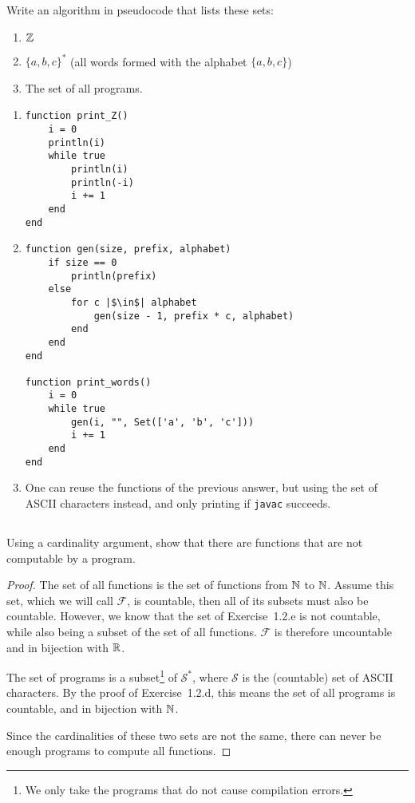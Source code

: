 \subsection{} %
Write an algorithm in pseudocode that lists these sets:
\begin{enumerate}
	\item \(\mathbb{Z}\)
	\item \(\{a, b, c\}^*\)
	(all words formed with the alphabet \(\{a, b, c\}\))
	\item The set of all \java{} programs.
\end{enumerate}

\begin{solution}
\begin{enumerate}
\item
\begin{verbatim}
function print_Z()
	i = 0
	println(i)
	while true
		println(i)
		println(-i)
		i += 1
	end
end
\end{verbatim}
\item
\begin{verbatim}
function gen(size, prefix, alphabet)
	if size == 0
		println(prefix)
	else
		for c |$\in$| alphabet
			gen(size - 1, prefix * c, alphabet)
		end
	end
end

function print_words()
	i = 0
	while true
		gen(i, "", Set(['a', 'b', 'c']))
		i += 1
	end
end
\end{verbatim}
\item One can reuse the functions of the previous answer,
but using the set of ASCII characters instead,
and only printing if \texttt{javac} succeeds.
\end{enumerate}
\end{solution}

\subsection{} %
Using a cardinality argument,
show that there are functions that are not computable by a \java{} program.

\begin{solution}
\begin{proof}
	The set of all functions is the set of functions from \(\mathbb{N}\) to \(\mathbb{N}\).
	Assume this set, which we will call \(\mathcal{F}\), is countable,
	then all of its subsets must also be countable.
	However, we know that the set of Exercise~1.2.e is not countable,
	while also being a subset of the set of all functions.
	\(\mathcal{F}\) is therefore uncountable and in bijection with \(\mathbb{R}\).

	The set of \java{} programs is a subset\footnote{We only take
	the programs that do not cause compilation errors.}
	of \(\mathcal{S}^*\),
	where \(\mathcal{S}\) is the (countable) set of ASCII characters.
	By the proof of Exercise~1.2.d,
	this means the set of all \java{} programs is countable,
	and in bijection with \(\mathbb{N}\).

	Since the cardinalities of these two sets are not the same,
	there can never be enough \java{} programs to compute all functions.
\end{proof}
\end{solution}

